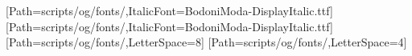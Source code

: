 %
\usepackage{fancyhdr}
\usepackage{ragged2e}
\usepackage{xcolor}

\newfontfamily{}[Path=scripts/og/fonts/,ItalicFont=BodoniModa-DisplayItalic.ttf]
\newfontfamily{}[Path=scripts/og/fonts/,ItalicFont=BodoniModa-DisplayItalic.ttf]
\newfontfamily{}[Path=scripts/og/fonts/,LetterSpace=8]
\newfontfamily{}[Path=scripts/og/fonts/,LetterSpace=4]

\AtBeginDocument{\frenchspacing}
\usepackage{titlesec}
\titleformat{\section}{\ccBodoniTesto\fontsize{17}{21}\selectfont\RaggedRight}{}{0pt}{}
\titleformat{\subsection}{\ccBodoniTesto\fontsize{13.5}{17}\selectfont\RaggedRight}{}{0pt}{}
\titleformat{\subsubsection}{\ccArchivo\footnotesize\MakeUppercase}{}{0pt}{}
\titlespacing*{\section}{0pt}{20pt}{8pt}
\titlespacing*{\subsection}{0pt}{14pt}{6pt}

